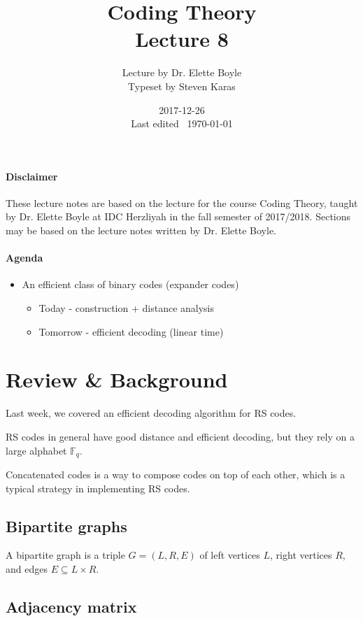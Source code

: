 \documentclass{idc_msc}
\title{Coding Theory\\\large Lecture 8}
\date{2017-12-26 \\ Last edited \currenttime\ \today}
\author{Lecture by Dr. Elette Boyle\\Typeset by Steven Karas}
\newcommand{\Fq}[1][q]{{\mathbb{F}_{#1}}}
\begin{document}
\maketitle

\paragraph{Disclaimer}

These lecture notes are based on the lecture for the course Coding Theory, taught by Dr. Elette Boyle at IDC Herzliyah in the fall semester of 2017/2018.
Sections may be based on the lecture notes written by Dr. Elette Boyle.

\paragraph{Agenda}

\begin{itemize}
  \item An efficient class of binary codes (expander codes)
  \begin{itemize}
    \item Today - construction + distance analysis
    \item Tomorrow - efficient decoding (linear time)
  \end{itemize}
\end{itemize}

\section{Review \& Background}

Last week, we covered an efficient decoding algorithm for RS codes.

RS codes in general have good distance and efficient decoding, but they rely on a large alphabet \(\Fq\).

Concatenated codes is a way to compose codes on top of each other, which is a typical strategy in implementing RS codes.

\subsection{Bipartite graphs}

A bipartite graph is a triple \(G=(L,R,E)\) of left vertices \(L\), right vertices \(R\), and edges \(E \subseteq L \times R\).

\subsection{Adjacency matrix}
\end{document}
